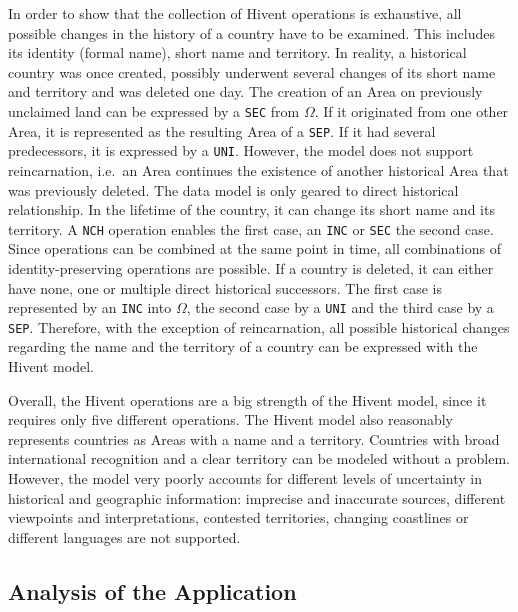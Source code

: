 In order to show that the collection of Hivent operations is exhaustive, all possible changes in the history of a country have to be examined. This includes its identity (formal name), short name and territory. In reality, a historical country was once created, possibly underwent several changes of its short name and territory and was deleted one day. The creation of an Area on previously unclaimed land can be expressed by a \texttt{SEC} from $\Omega$. If it originated from one other Area, it is represented as the resulting Area of a \texttt{SEP}. If it had several predecessors, it is expressed by a \texttt{UNI}. However, the model does not support reincarnation, i.e.\ an Area continues the existence of another historical Area that was previously deleted. The data model is only geared to direct historical relationship. In the lifetime of the country, it can change its short name and its territory. A \texttt{NCH} operation enables the first case, an \texttt{INC} or \texttt{SEC} the second case. Since operations can be combined at the same point in time, all combinations of identity-preserving operations are possible. If a country is deleted, it can either have none, one or multiple direct historical successors. The first case is represented by an \texttt{INC} into $\Omega$, the second case by a \texttt{UNI} and the third case by a \texttt{SEP}. Therefore, with the exception of reincarnation, all possible historical changes regarding the name and the territory of a country can be expressed with the Hivent model.


Overall, the Hivent operations are a big strength of the Hivent model, since it requires only five different operations.
The Hivent model also reasonably represents countries as Areas with a name and a territory. Countries with broad international recognition and a clear territory can be modeled without a problem. However, the model very poorly accounts for different levels of uncertainty in historical and geographic information: imprecise and inaccurate sources, different viewpoints and interpretations, contested territories, changing coastlines or different languages are not supported.



\subsection{Analysis of the Application} %
\label{sub:application}

